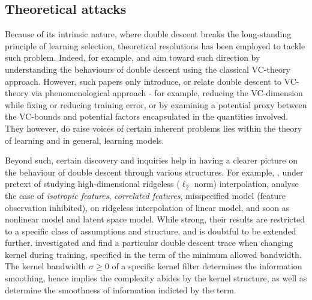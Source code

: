 \documentclass[10pt]{article} %
\begin{document}
\subsection{Theoretical attacks}

Because of its intrinsic nature, where double descent breaks the long-standing principle of learning selection, theoretical resolutions has been employed to tackle such problem. Indeed, for example, \cite{cherkassky2024understand} and \cite{lee2022vctheoreticalexplanationdouble} aim toward such direction by understanding the behaviours of double descent using the classical VC-theory approach. However, such papers only introduce, or relate double descent to VC-theory via phenomenological approach - for example, reducing the VC-dimension while fixing or reducing training error, or by examining a potential proxy between the VC-bounds and potential factors encapsulated in the quantities involved. They however, do raise voices of certain inherent problems lies within the theory of learning and in general, learning models. 

Beyond such, certain discovery and inquiries help in having a clearer picture on the behaviour of double descent through various structures. For example, \cite{hastie2019surprises}, under pretext of studying high-dimensional ridgeless ($\ell_{2}$ norm) interpolation, analyse the case of \textit{isotropic features}, \textit{correlated features}, misspecified model (feature observation inhibited), on ridgeless interpolation of linear model, and soon as nonlinear model and latent space model. While strong, their results are restricted to a specific class of assumptions and structure, and is doubtful to be extended further. \cite{allerbo2025changingkerneltrainingleads} investigated and find a particular double descent trace when changing kernel during training, specified in the term of the minimum allowed bandwidth. The kernel bandwidth $\sigma\geq 0$ of a specific kernel filter determines the information smoothing, hence implies the complexity abides by the kernel structure, as well as determine the smoothness of information indicted by the term. 
\end{document}
